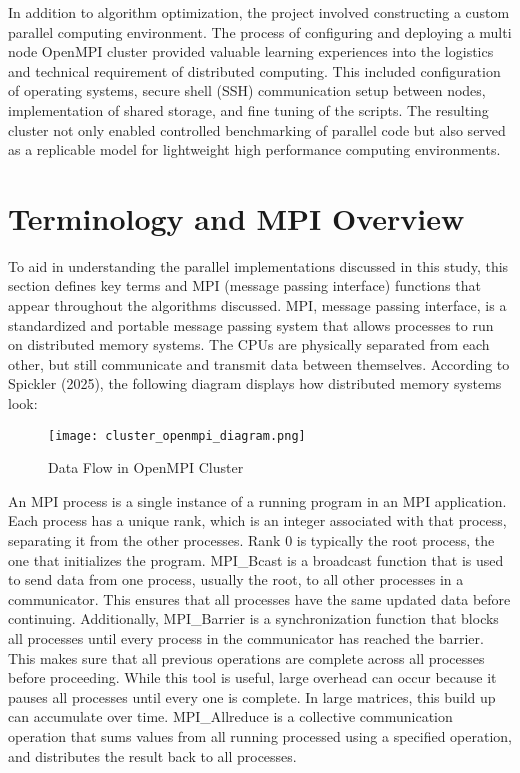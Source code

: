\documentclass[12pt]{article}
\begin{document}
In addition to algorithm optimization, the project involved constructing a custom parallel computing environment. The process of configuring and deploying a multi node OpenMPI cluster provided valuable learning experiences into the logistics and technical requirement of distributed computing. This included configuration of operating systems, secure shell (SSH)  communication setup between nodes, implementation of shared storage, and fine tuning of the scripts. The resulting cluster not only enabled controlled benchmarking of parallel code but also served as a replicable model for lightweight high performance computing environments.

\section{Terminology and MPI Overview}
To aid in understanding the parallel implementations discussed in this study, this section defines key terms and MPI (message passing interface) functions that appear throughout the algorithms discussed. MPI, message passing interface, is a standardized and portable message passing system that allows processes to run on distributed memory systems. The CPUs are physically separated from each other, but still communicate and transmit data between themselves. According to Spickler (2025), the following diagram displays how distributed memory systems look:

\begin{figure}[H]
    \centering
    \texttt{[image: cluster\_openmpi\_diagram.png]}
    \caption{Data Flow in OpenMPI Cluster}
    \label{fig:mpi_diagram}
\end{figure}

An MPI process is a single instance of a running program in an MPI application. Each process has a unique rank, which is an integer associated with that process, separating it from the other processes. Rank 0 is typically the root process, the one that initializes the program. MPI\_Bcast is a broadcast function that is used to send data from one process, usually the root, to all other processes in a communicator. This ensures that all processes have the same updated data before continuing. Additionally, MPI\_Barrier is a synchronization function that blocks all processes until every process in the communicator has reached the barrier. This makes sure that all previous operations are complete across all processes before proceeding. While this tool is useful, large overhead can occur because it pauses all processes until every one is complete. In large matrices, this build up can accumulate over time. MPI\_Allreduce is a collective communication operation that sums values from all running processed using a specified operation, and distributes the result back to all processes. 
\end{document}
